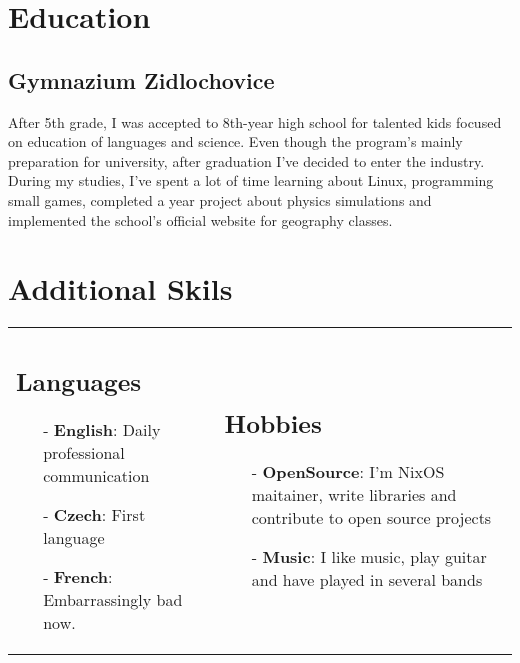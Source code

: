 \documentclass[9pt]{article}
\begin{document}
\section{Education}

\subsection{Gymnazium Zidlochovice}
After 5th grade, I was accepted to 8th-year high school for talented kids focused on education of languages and science.
Even though the program's mainly preparation for university, after graduation I've decided to enter
the industry. During my studies, I've spent a lot of time learning about Linux, programming small
games, completed a year project about physics simulations and implemented the school's
official website for geography classes.

\vspace{0.3cm}
\section{Additional Skils}
\vspace{-0.3cm}

\begin{tabular}{@{}ll}
  \begin{minipage}[t]{0.5\textwidth}
      \subsection{Languages}
      \begin{itemize}[leftmargin=0.3cm]
        \item[-] \textbf{English}: Daily professional communication
        \item[-] \textbf{Czech}: First language
        \item[-] \textbf{French}: Embarrassingly bad now.
      \end{itemize}
  \end{minipage}
  & \begin{minipage}[t]{0.5\textwidth}
      \subsection{Hobbies}
      \begin{itemize}[leftmargin=0.3cm]
        \item[-] \textbf{OpenSource}: I'm NixOS maitainer, write libraries and contribute to open source projects
        \item[-] \textbf{Music}: I like music, play guitar and have played in several bands
      \end{itemize}
  \end{minipage} \\
\end{tabular}
\end{document}
